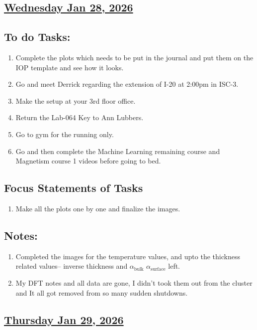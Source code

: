 \subsection*{\underline{Wednesday Jan 28, 2026} }
\subsection*{To do Tasks:}
\begin{enumerate}
    \item Complete the plots which needs to be put in the journal and put them on the IOP template and see how it looks. \cmark
    \item Go and meet Derrick regarding the extension of I-20 at 2:00pm in ISC-3. \cmark
    \item Make the setup at your 3rd floor office. \cmark
    \item Return the Lab-064 Key to Ann Lubbers. \cmark
    \item Go to gym for the running only. \cmark
    \item Go and then complete the Machine Learning remaining course and Magnetism course 1 videos before going to bed.
\end{enumerate}
\subsection*{Focus Statements of Tasks}
\begin{enumerate}[\ding{52}]  %
    \item Make all the plots one by one and finalize the images. 
\end{enumerate}
\subsection*{Notes:}
\begin{enumerate}
    \item Completed the images for the temperature values, and upto the thickness related values-- inverse thickness and $\alpha_{\mathrm{bulk}}$ $\alpha_{\mathrm{surface}}$ left.
    \item My DFT notes and all data are gone, I didn't took them out from the cluster and It all got removed from so many sudden shutdowns.
\end{enumerate}
\subsection*{\underline{Thursday Jan 29, 2026}}
